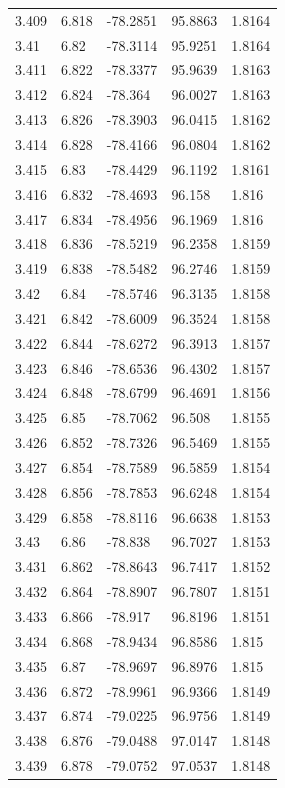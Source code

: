 \begin{tabular}{lllll}
3.409 & 6.818 & -78.2851 & 95.8863 & 1.8164 \\
3.41 & 6.82 & -78.3114 & 95.9251 & 1.8164 \\
3.411 & 6.822 & -78.3377 & 95.9639 & 1.8163 \\
3.412 & 6.824 & -78.364 & 96.0027 & 1.8163 \\
3.413 & 6.826 & -78.3903 & 96.0415 & 1.8162 \\
3.414 & 6.828 & -78.4166 & 96.0804 & 1.8162 \\
3.415 & 6.83 & -78.4429 & 96.1192 & 1.8161 \\
3.416 & 6.832 & -78.4693 & 96.158 & 1.816 \\
3.417 & 6.834 & -78.4956 & 96.1969 & 1.816 \\
3.418 & 6.836 & -78.5219 & 96.2358 & 1.8159 \\
3.419 & 6.838 & -78.5482 & 96.2746 & 1.8159 \\
3.42 & 6.84 & -78.5746 & 96.3135 & 1.8158 \\
3.421 & 6.842 & -78.6009 & 96.3524 & 1.8158 \\
3.422 & 6.844 & -78.6272 & 96.3913 & 1.8157 \\
3.423 & 6.846 & -78.6536 & 96.4302 & 1.8157 \\
3.424 & 6.848 & -78.6799 & 96.4691 & 1.8156 \\
3.425 & 6.85 & -78.7062 & 96.508 & 1.8155 \\
3.426 & 6.852 & -78.7326 & 96.5469 & 1.8155 \\
3.427 & 6.854 & -78.7589 & 96.5859 & 1.8154 \\
3.428 & 6.856 & -78.7853 & 96.6248 & 1.8154 \\
3.429 & 6.858 & -78.8116 & 96.6638 & 1.8153 \\
3.43 & 6.86 & -78.838 & 96.7027 & 1.8153 \\
3.431 & 6.862 & -78.8643 & 96.7417 & 1.8152 \\
3.432 & 6.864 & -78.8907 & 96.7807 & 1.8151 \\
3.433 & 6.866 & -78.917 & 96.8196 & 1.8151 \\
3.434 & 6.868 & -78.9434 & 96.8586 & 1.815 \\
3.435 & 6.87 & -78.9697 & 96.8976 & 1.815 \\
3.436 & 6.872 & -78.9961 & 96.9366 & 1.8149 \\
3.437 & 6.874 & -79.0225 & 96.9756 & 1.8149 \\
3.438 & 6.876 & -79.0488 & 97.0147 & 1.8148 \\
3.439 & 6.878 & -79.0752 & 97.0537 & 1.8148 \\

\end{tabular}
